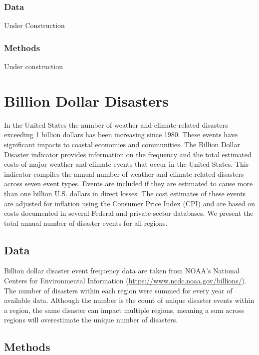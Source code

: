 \documentclass[
]{book}
\begin{document}
\hypertarget{data-20}{%
\subsection{Data}\label{data-20}}

Under Construction

\hypertarget{methods-20}{%
\subsection{Methods}\label{methods-20}}

Under construction

\hypertarget{billion-dollar-disasters}{%
\chapter{Billion Dollar Disasters}\label{billion-dollar-disasters}}

In the United States the number of weather and climate-related disasters exceeding 1 billion dollars has been increasing since 1980. These events have significant impacts to coastal economies and communities. The Billion Dollar Disaster indicator provides information on the frequency and the total estimated costs of major weather and climate events that occur in the United States. This indicator compiles the annual number of weather and climate-related disasters across seven event types. Events are included if they are estimated to cause more than one billion U.S. dollars in direct losses. The cost estimates of these events are adjusted for inflation using the Consumer Price Index (CPI) and are based on costs documented in several Federal and private-sector databases. We present the total annual number of disaster events for all regions.

\hypertarget{data-21}{%
\section{Data}\label{data-21}}

Billion dollar disaster event frequency data are taken from NOAA's National Centers for Environmental Information (\url{https://www.ncdc.noaa.gov/billions/}). The number of disasters within each region were summed for every year of available data. Although the number is the count of unique disaster events within a region, the same disaster can impact multiple regions, meaning a sum across regions will overestimate the unique number of disasters.

\hypertarget{methods-21}{%
\section{Methods}\label{methods-21}}
\end{document}
